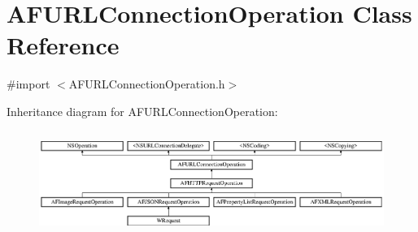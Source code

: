 \hypertarget{interface_a_f_u_r_l_connection_operation}{\section{A\-F\-U\-R\-L\-Connection\-Operation Class Reference}
\label{interface_a_f_u_r_l_connection_operation}
}


{\ttfamily \#import $<$A\-F\-U\-R\-L\-Connection\-Operation.\-h$>$}

Inheritance diagram for A\-F\-U\-R\-L\-Connection\-Operation\-:\begin{figure}[H]
\begin{center}
\leavevmode
\includegraphics[height=3.414634cm]{interface_a_f_u_r_l_connection_operation}
\end{center}
\end{figure}
